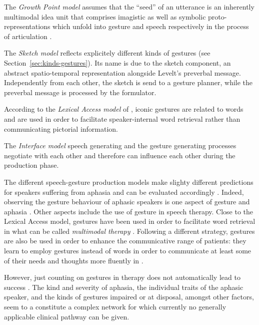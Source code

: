 \documentclass[output=paper]{langsci/langscibook}
\begin{document}
The \emph{Growth Point model} \citep{McNeill:Duncan:2000} assumes that the \enquote{seed} of an utterance is an inherently multimodal idea unit that comprises imagistic as well as symbolic proto-representations which unfold into gesture and speech respectively in the process of articulation \citetext{see also \citealt{Roepke:2011} on growth point's involvedness in contexts and frames}.

The \emph{Sketch model}  \citep{de:Ruiter:2000} reflects explicitely different kinds of gestures (see Section~\ref{sec:kinds-gestures}). 
%
Its name is due to the sketch component, an abstract spatio-temporal representation alongside Levelt's preverbal message. 
%
Independently from each other, the sketch is send to a gesture planner, while the preverbal message is processed by the formulator.

According to the \emph{Lexical Access model}  of \citet{Krauss:Chen:Gottesmann:2000}, iconic gestures are related to words and are used in order to facilitate speaker-internal word retrieval rather than communicating pictorial information.

The \emph{Interface model}  \citep{Kita:Ozyurek:2003} speech generating and the gesture generating processes negotiate with each other and therefore can influence each other during the production phase.

The different speech-gesture production models make slighty different predictions for speakers suffering from aphasia and can be evaluated accordingly \citep{deRuiter:deBeer:2013}.
%
Indeed, observing the gesture behaviour of aphasic speakers is one aspect of gesture and aphasia \citep{Jakob:Bartmann:Goldenberg:Ziegler:Hogrefe:2011,Kong:Law:Chak:2017,Sekine:Rose:2013}.
%
Other aspects include the use of gesture in speech therapy. 
%
Close to the Lexical Access model, gestures have been used in order to facilitate word retrieval in what can be called \emph{multimodal therapy}  \citet{Rose:2006}.
%
Following a different strategy, gestures are also be used in order to enhance the communicative range of patients: they learn to employ gestures instead of words in order to communicate at least some of their needs and thoughts more fluently in \citep{Cubelli:Trentini:Montagna:1991,Caute:et:al:2013}.

However, just counting on gestures in therapy does not automatically lead to success \citep{Auer:Bauer:2011}. 
%
The kind and severity of aphasia, the individual traits of the aphasic speaker, and the kinds of gestures impaired or at disposal, amongst other factors, seem to a constitute a complex network for which currently no generally applicable clinical pathway can be given.
\end{document}
